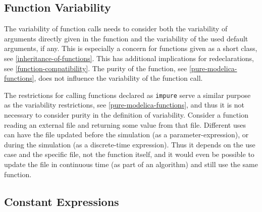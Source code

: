 \subsection{Function Variability}\label{function-variability}

The variability of function calls needs to consider both the variability of arguments directly given in the function and the variability of the used default arguments, if any.
This is especially a concern for functions given as a short class, see \cref{inheritance-of-functions}.
This has additional implications for redeclarations, see \cref{function-compatibility}.
The purity of the function, see \cref{pure-modelica-functions}, does not influence the variability of the function call.

\begin{nonnormative}
The restrictions for calling functions declared as \lstinline!impure! serve a similar purpose as the variability restrictions, see \cref{pure-modelica-functions}, and thus it is not necessary to consider purity in the definition of variability.
Consider a function reading an external file and returning some value from that file.
Different uses can have the file updated before the simulation (as a parameter-expression), or during the simulation (as a discrete-time expression).
Thus it depends on the use case and the specific file, not the function itself, and it would even be possible to update the file in continuous time (as part of an algorithm) and still use the same function.
\end{nonnormative}

\subsection{Constant Expressions}\label{constant-expressions}

